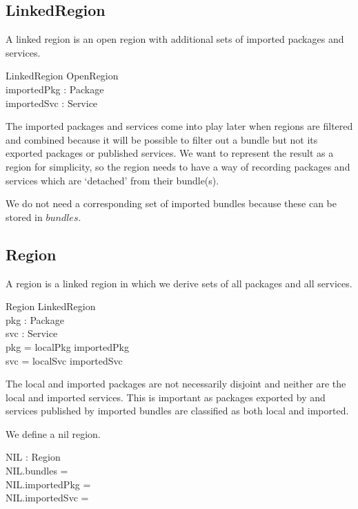 \documentclass[a4paper,9pt]{article}
\begin{document}
\subsection{LinkedRegion}

A linked region is an open region with additional sets of imported packages and services.

\begin{schema}{LinkedRegion}
  OpenRegion \\
  importedPkg : \power Package \\
  importedSvc : \power Service \\  
\end{schema}
The imported packages and services come into play later when regions are filtered and combined
because it will be possible to filter out a bundle but not its exported packages or published services.
We want to represent the result as a region for simplicity, so the region needs to have a way
of recording packages and services which are `detached' from their bundle(s).

We do not need a corresponding set of imported bundles because these can be stored in $bundles$.

\subsection{Region}

A region is a linked region in which we derive sets of all packages and all services.
\begin{schema}{Region}
  LinkedRegion \\
  pkg : \power Package \\
  svc : \power Service \\
\where
  pkg = localPkg \cup importedPkg \\
  svc = localSvc \cup importedSvc \\
\end{schema}
The local and imported packages are not necessarily disjoint and neither are the local and imported
services. This is important as packages exported by and services published by imported bundles
are classified as both local and imported.

We define a nil region.
\begin{axdef}
  NIL : Region \\
\where
 NIL.bundles = \emptyset \\
 NIL.importedPkg = \emptyset \\
 NIL.importedSvc = \emptyset \\
 \end{axdef}
\end{document}

